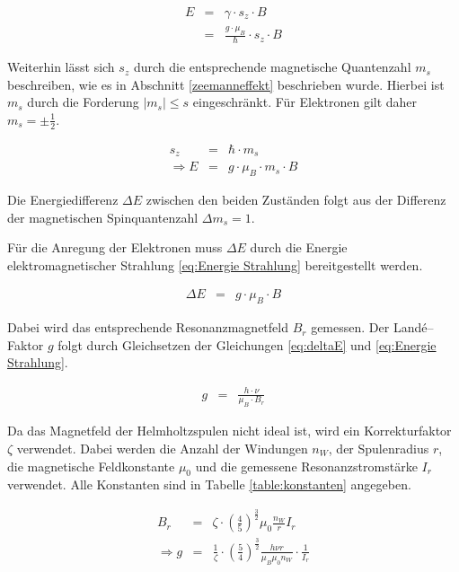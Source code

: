 \documentclass[12pt,a4paper]{scrartcl}
\numberwithin{equation}{section} %
\begin{document}
\begin{eqnarray}
	E &=& \gamma \cdot s_z \cdot B \\
		&=& \frac{g \cdot \mu_B}{\hbar} \cdot s_z \cdot B
\end{eqnarray}

\noindent
Weiterhin lässt sich $s_z$ durch die entsprechende magnetische Quantenzahl $m_s$ beschreiben, wie es in Abschnitt \ref{zeemanneffekt} beschrieben wurde. Hierbei ist $m_s$ durch die Forderung $|m_s|\le s$ eingeschränkt. Für Elektronen gilt daher $m_s=\pm\frac{1}{2}$.

\begin{eqnarray}
	s_z &=& \hbar \cdot m_s \\
	\Rightarrow E &=& g \cdot \mu_B \cdot m_s \cdot B
\end{eqnarray}

\noindent
Die Energiedifferenz $\Delta E$ zwischen den beiden Zuständen folgt aus der Differenz der magnetischen Spinquantenzahl $\Delta m_s = 1$.

Für die Anregung der Elektronen muss $\Delta E$ durch die Energie elektromagnetischer Strahlung \eqref{eq:Energie Strahlung} bereitgestellt werden.

\begin{eqnarray}
	\Delta E &=& g \cdot \mu_B \cdot B \label{eq:deltaE}
\end{eqnarray}

Dabei wird das entsprechende Resonanzmagnetfeld $B_r$ gemessen. Der Landé--Faktor $g$ folgt durch Gleichsetzen der Gleichungen \eqref{eq:deltaE} und \eqref{eq:Energie Strahlung}.

\begin{eqnarray}
	g &=& \frac{h \cdot \nu}{\mu_B \cdot B_r}
\end{eqnarray}

\noindent
Da das Magnetfeld der Helmholtzspulen nicht ideal ist, wird ein Korrekturfaktor $\zeta$ verwendet. Dabei werden die Anzahl der Windungen $n_W$, der Spulenradius $r$, die magnetische Feldkonstante $\mu_0$ und die gemessene Resonanzstromstärke $I_r$ verwendet. Alle Konstanten sind in Tabelle \ref{table:konstanten} angegeben.

\begin{eqnarray}
	B_r &=& \zeta \cdot
			\left(\frac{4}{5}\right)^{\frac{3}{2}}
			\mu_0 \frac{n_W}{r} I_r
			\label{eq:b_r} \\
	\Rightarrow g &=& \frac{1}{\zeta} \cdot
			\left(\frac{5}{4}\right)^{\frac{3}{2}}
			\frac{h \nu r}{\mu_B \mu_0 n_W} \cdot \frac{1}{I_r}
			\label{eq:gFaktor}
\end{eqnarray}
\end{document}
